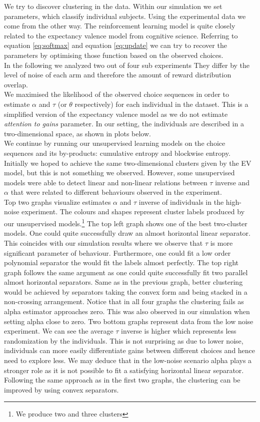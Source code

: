 \documentclass[12pt,a4paper,bibliography=totocnumbered,listof=totocnumbered]{scrartcl}
\begin{document}
We try to discover clustering in the data. Within our simulation we set parameters, which classify individual subjects. Using the experimental data we come from the other way. The reinforcement learning model is quite closely related to the expectancy valence model from cognitive science. Referring to equation \eqref{eq:softmax} and equation \eqref{eq:update} we can try to recover the parameters by optimising those function based on the observed choices.\\
In the following we analyzed two out of four sub experiments They differ by the level of noise of each arm and therefore the amount of reward distribution overlap.\\
We maximised the likelihood of the observed choice sequences in order to estimate $\alpha$ and $\tau$ (or $\theta$ respectively) for each individual in the dataset. This is a simplified version of the expectancy valence model as we do not estimate \textit{attention to gains} parameter. In our setting, the individuals are described in a two-dimensional space, as shown in plots below.\\
We continue by running our unsupervised learning models on the choice sequences and its by-products: cumulative entropy and blockwise entropy. Initially we hoped to achieve the same two-dimensional clusters given by the EV model, but this is not something we observed. However, some unsupervised models were able to detect linear and non-linear relations between $\tau$ inverse and $\alpha$ that were related to different behaviours observed in the experiment.\\
Top two graphs visualize estimates $\alpha$ and $\tau$ inverse of individuals in the high-noise experiment. The colours and shapes represent cluster labels produced by our unsupervised models.\footnote{We produce two and three clusters} The top left graph shows one of the best two-cluster models. One could quite successfully draw an almost horizontal linear separator. This coincides with our simulation results where we observe that $\tau$ is more significant parameter of behaviour. Furthermore, one could fit a low order polynomial separator the would fit the labels almost perfectly. The top right graph follows the same argument as one could quite successfully fit two parallel almost horizontal separators. Same as in the previous graph, better clustering would be achieved by separators taking the convex form and being stacked in a non-crossing arrangement. Notice that in all four graphs the clustering fails as alpha estimator approaches zero. This was also observed in our simulation when setting alpha close to zero.
Two bottom graphs represent data from the low noise experiment. We can see the average $\tau$ inverse is higher which represents less randomization by the individuals. This is not surprising as due to lower noise, individuals can more easily differentiate gains between different choices and hence need to explore less. We may deduce that in the low-noise scenario alpha plays a stronger role as it is not possible to fit a satisfying horizontal linear separator. Following the same approach as in the first two graphs, the clustering can be improved by using convex separators.
\end{document}
